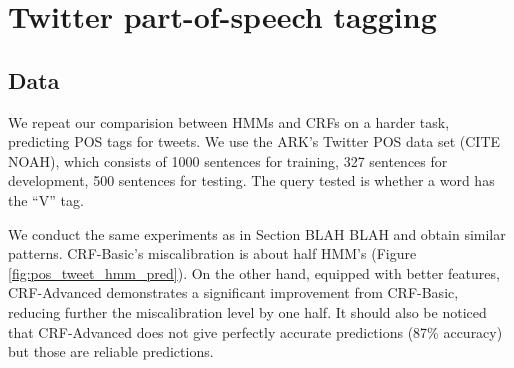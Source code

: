 \section{Twitter part-of-speech tagging}
\subsection{Data}

We repeat our comparision between HMMs and CRFs on a harder task, predicting POS tags for tweets. We use the ARK's Twitter POS data set (CITE NOAH), which consists of 1000 sentences for training, 327 sentences for development, 500 sentences for testing. The query tested is whether a word has the ``V'' tag. 

We conduct the same experiments as in Section BLAH BLAH and obtain similar patterns. CRF-Basic's miscalibration is about half HMM's (Figure \ref{fig:pos_tweet_hmm_pred}). On the other hand, equipped with better features, CRF-Advanced demonstrates a significant improvement from CRF-Basic, reducing further the miscalibration level by one half. It should also be noticed that CRF-Advanced does not give perfectly accurate predictions (87\% accuracy) but those are reliable predictions.   

